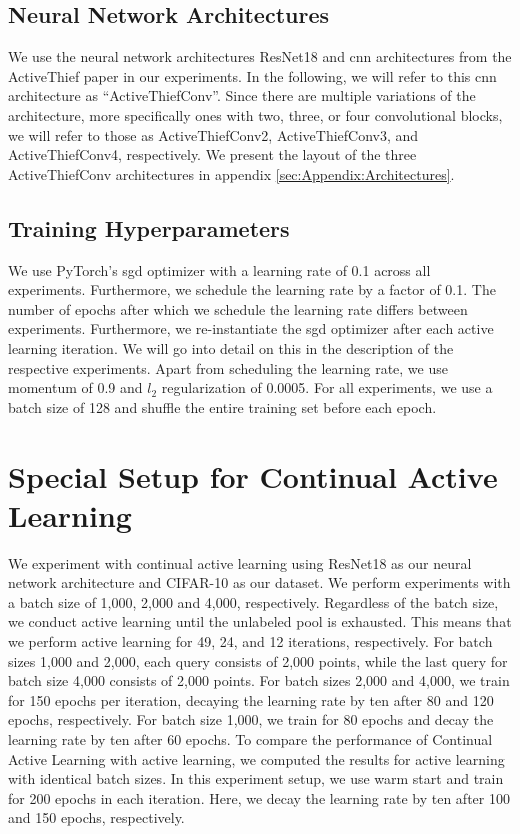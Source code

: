 \subsection{Neural Network Architectures}
\label{sec:ExperimentSetup:NNArchitectures}
We use the neural network architectures ResNet18 \cite{he2016deep} and \gls{cnn} architectures from the ActiveThief paper \cite{pal2020activethief} in our experiments.
In the following, we will refer to this \gls{cnn} architecture as \enquote{ActiveThiefConv}. Since there are multiple variations of the architecture, more specifically
ones with two, three, or four convolutional blocks, we will refer to those as ActiveThiefConv2, ActiveThiefConv3, and ActiveThiefConv4, respectively. We present the
layout of the three ActiveThiefConv architectures in appendix \ref{sec:Appendix:Architectures}.


\subsection{Training Hyperparameters}
\label{sec:ExperimentSetup:Hyperparameters}
We use PyTorch's \gls{sgd} optimizer with a learning rate of 0.1 across all experiments. Furthermore, we schedule the learning rate by a factor of 0.1. The number of
epochs after which we schedule the learning rate differs between experiments. Furthermore, we re-instantiate the \gls{sgd} optimizer after each active learning
iteration. We will go into detail on this in the description of the respective experiments. Apart from scheduling the learning rate, we use momentum \cite{cutkosky2020momentum}
of 0.9 and $l_2$ regularization of 0.0005. For all experiments, we use a batch size of 128 and shuffle the entire training set before each epoch.


\section{Special Setup for Continual Active Learning}
\label{sec:Methodology:CALsetup}
We experiment with continual active learning using ResNet18 as our neural network architecture and CIFAR-10 as our dataset. We perform experiments with a batch size of 1,000,
2,000 and 4,000, respectively. Regardless of the batch size, we conduct active learning until the unlabeled pool is exhausted. This means that we perform active learning for
49, 24, and 12 iterations, respectively. For batch sizes 1,000 and 2,000, each query consists of 2,000 points, while the last query for batch size 4,000 consists of 2,000 points.
For batch sizes 2,000 and 4,000, we train for 150 epochs per iteration, decaying the learning rate by ten after 80 and 120 epochs, respectively. For batch size 1,000, we
train for 80 epochs and decay the learning rate by ten after 60 epochs. To compare the performance of Continual Active Learning with active learning, we computed the results
for active learning with identical batch sizes. In this experiment setup, we use warm start and train for 200 epochs in each iteration. Here, we
decay the learning rate by ten after 100 and 150 epochs, respectively.

